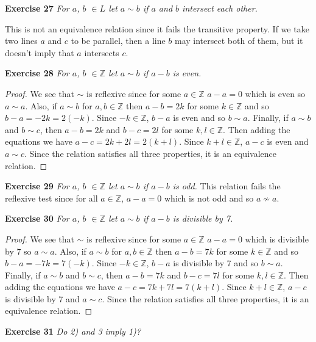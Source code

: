 \documentclass{article}
\begin{document}
\begin{flushleft}
\textbf{Exercise 27}
\textsl{For $a$, $b$ $\in L$ let $a \sim b$ if $a$ and $b$ intersect each other.}\newline

This is not an equivalence relation since it fails the transitive property. If we take two lines $a$ and $c$ to be parallel, then a line $b$ may intersect both of them, but it doesn't imply that $a$ intersects $c$.\newline

\textbf{Exercise 28}
\textsl{For $a$, $b$ $\in \mathbb{Z}$ let $a \sim b$ if $a-b$ is even.}
\begin{proof}
We see that $\sim$ is reflexive since for some $a \in \mathbb{Z}$ $a-a=0$ which is even so $a \sim a$. Also, if $a \sim b$ for $a, b \in \mathbb{Z}$ then $a-b=2k$ for some $k \in \mathbb{Z}$ and so $b-a=-2k=2(-k)$. Since $-k \in \mathbb{Z}$, $b-a$ is even and so $b \sim a$. Finally, if $a \sim b$ and $b \sim c$, then $a-b=2k$ and $b-c=2l$ for some $k,l \in \mathbb{Z}$. Then adding the equations we have $a-c=2k+2l=2(k+l)$. Since $k+l \in \mathbb{Z}$, $a-c$ is even and $a \sim c$. Since the relation satisfies all three properties, it is an equivalence relation.
\end{proof}

\textbf{Exercise 29}
\textsl{For $a$, $b$ $\in \mathbb{Z}$ let $a \sim b$ if $a-b$ is odd.}\newline
This relation fails the reflexive test since for all $a \in \mathbb{Z}$, $a-a=0$ which is not odd and so $a \nsim a$.\newline

\textbf{Exercise 30}
\textsl{For $a$, $b$ $\in \mathbb{Z}$ let $a \sim b$ if $a-b$ is divisible by 7.}
\begin{proof}
We see that $\sim$ is reflexive since for some $a \in \mathbb{Z}$ $a-a=0$ which is divisible by 7 so $a \sim a$. Also, if $a \sim b$ for $a, b \in \mathbb{Z}$ then $a-b=7k$ for some $k \in \mathbb{Z}$ and so $b-a=-7k=7(-k)$. Since $-k \in \mathbb{Z}$, $b-a$ is divisible by 7 and so $b \sim a$. Finally, if $a \sim b$ and $b \sim c$, then $a-b=7k$ and $b-c=7l$ for some $k,l \in \mathbb{Z}$. Then adding the equations we have $a-c=7k+7l=7(k+l)$. Since $k+l \in \mathbb{Z}$, $a-c$ is divisible by 7 and $a \sim c$. Since the relation satisfies all three properties, it is an equivalence relation.
\end{proof}

\textbf{Exercise 31}
\textsl{Do 2) and 3 imply 1)?}\newline


\end{flushleft}
\end{document}
